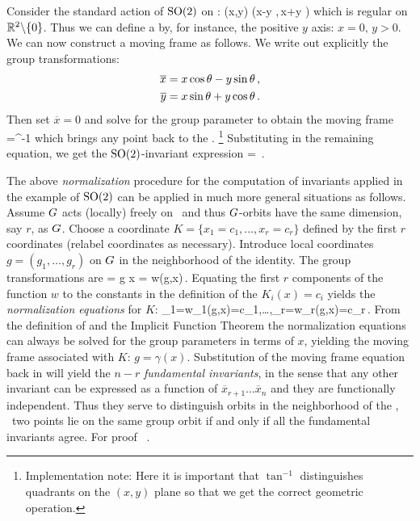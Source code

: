 \begin{example}
Consider the standard action of $\textrm{SO}(2)$ on :
\beq
	(x,y) \mapsto (x\cos\theta -y \sin\theta,\,x\sin\theta +y \cos\theta )
\eeq
which is regular on $\mathbb{R}^{2}\backslash\{0\}$. Thus we can define
a {\csection} by, for instance, the
positive $y$ axis: $x=0,\,y>0$.
We can now construct a moving frame as follows. We write out
explicitly the group transformations:
\begin{subequations}
\begin{align}
 	\overline{x} &= x \cos\theta - y \sin\theta\label{eq:explSO2stnd1}\,, \\ 
	\overline{y} &= x \sin\theta + y \cos\theta\label{eq:explSO2stnd2}\,.
\end{align}
\end{subequations}
Then set $\overline{x}=0$ and solve  for the group
parameter to obtain the moving frame
\beq
	\theta=\tan^{-1}
	\label{eq:SO2stndMF}
\eeq
which brings any point  back to the {\csection}.
\footnote{Implementation note: Here it is important that
$\tan^{-1}$ distinguishes quadrants on the $(x,y)$ plane so
that we get the correct geometric operation.}
Substituting  in the remaining equation,
we get the $\textrm{SO}(2)$-invariant expression
\beq
	 = \,.
\eeq
\end{example}

The above \emph{normalization} procedure for the computation of
invariants applied in the example of $\textrm{SO}(2)$ can be applied
in much more general situations as follows. Assume $G$
acts (locally) freely
on \Manif\  and thus $G$-orbits have the same dimension,
say $r$, as $G$.  Choose a coordinate {\csection}
$K=\{x_1=c_1,\ldots,x_r=c_r\}$ defined by the first $r$
coordinates (relabel coordinates as necessary). Introduce
local coordinates $g=(g_1,\ldots,g_r)$ on $G$ in the
neighborhood of the identity. The group transformations are
\beq
	= g \cdot x = w(g,x)\,.
	\label{eq:transNorm}
\eeq
Equating the first $r$ components of the function $w$ to the
constants in the definition of the {\csection} $K_i(x)=c_i$
yields the \emph{normalization equations} for $K$:
\beq
	_1=w_1(g,x)=c_1,\ldots,_r=w_r(g,x)=c_r\,.
	\label{eq:normalization}
\eeq
From the definition of {\csection} and the Implicit Function
Theorem the normalization equations 
can always be solved for the group parameters in terms of
$x$, yielding the moving frame associated with $K$:
$g=\gamma(x)$. Substitution of the moving frame equation back
in  will yield the $n-r$
\emph{fundamental invariants}, in the sense that any other
invariant can be expressed as a function of
$\overline{x}_{r+1}\ldots\overline{x}_n$ and they are
functionally independent. Thus they serve to distinguish
orbits in the neighborhood of the {\csection}, \ie~two points
lie on the same group orbit if and only if all the
fundamental invariants agree. For proof
\cf~.

